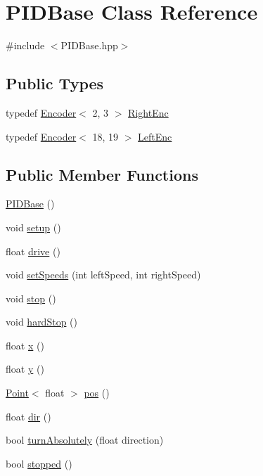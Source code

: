\hypertarget{classPIDBase}{\section{P\-I\-D\-Base Class Reference}
\label{classPIDBase}
}


{\ttfamily \#include $<$P\-I\-D\-Base.\-hpp$>$}

\subsection*{Public Types}
\begin{DoxyCompactItemize}
\item 
typedef \hyperlink{classEncoder}{Encoder}$<$ 2, 3 $>$ \hyperlink{classPIDBase_ac5805fb7b51c9e4fedaab034d268464a}{Right\-Enc}
\item 
typedef \hyperlink{classEncoder}{Encoder}$<$ 18, 19 $>$ \hyperlink{classPIDBase_a7f9720adebb7763418d066d4fc4f8e25}{Left\-Enc}
\end{DoxyCompactItemize}
\subsection*{Public Member Functions}
\begin{DoxyCompactItemize}
\item 
\hyperlink{classPIDBase_a3d1adc8f47087f795979fb5596ea3e7d}{P\-I\-D\-Base} ()
\item 
void \hyperlink{classPIDBase_a326fb682c5a801ed57a98418db7702a4}{setup} ()
\item 
float \hyperlink{classPIDBase_ab7cfca91244b4177752dcc0fbf8d6f4d}{drive} ()
\item 
void \hyperlink{classPIDBase_ab078b6c0e03b48efc73def33eb1b03e2}{set\-Speeds} (int left\-Speed, int right\-Speed)
\item 
void \hyperlink{classPIDBase_adf5a06686538194d39659ddadc78def6}{stop} ()
\item 
void \hyperlink{classPIDBase_aa010fa26cf28d05554efe0a0ce4fa74d}{hard\-Stop} ()
\item 
float \hyperlink{classPIDBase_adcec556fd426590a5b05054614344b89}{x} ()
\item 
float \hyperlink{classPIDBase_a9557526e6f2048616cb84ccf65cfe235}{y} ()
\item 
\hyperlink{classPoint}{Point}$<$ float $>$ \hyperlink{classPIDBase_aaaa94fd117259cec77f6127244b36d6a}{pos} ()
\item 
float \hyperlink{classPIDBase_abde01e16704fe190c8eff5bb9bb5f2ae}{dir} ()
\item 
bool \hyperlink{classPIDBase_a92c97e24856e2812e0b6d027ab99ee63}{turn\-Absolutely} (float direction)
\item 
bool \hyperlink{classPIDBase_ad577132b4c9a2b0d26dc0a94e950efbc}{stopped} ()
\end{DoxyCompactItemize}
